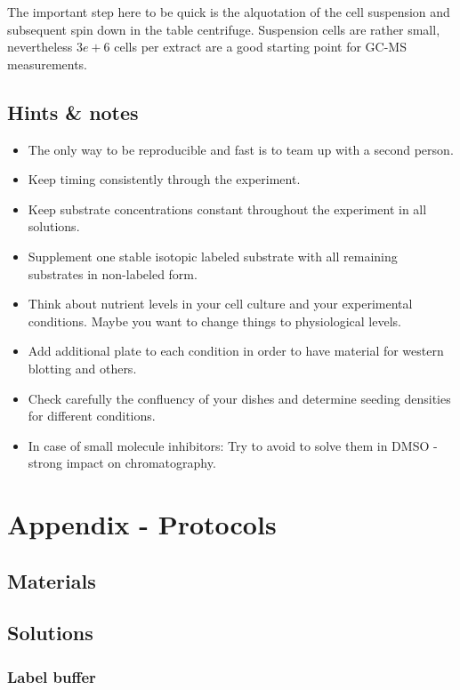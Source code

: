 \documentclass[]{book}
\providecommand{\tightlist}{%
  \setlength{\itemsep}{0pt}\setlength{\parskip}{0pt}}
\theoremstyle{definition}
\theoremstyle{definition}
\theoremstyle{definition}
\theoremstyle{remark}
\begin{document}
The important step here to be quick is the alquotation of the cell
suspension and subsequent spin down in the table centrifuge. Suspension
cells are rather small, nevertheless \(3e+6\) cells per extract are a
good starting point for GC-MS measurements.

\section{Hints \& notes}\label{hints-notes}

\begin{itemize}
\tightlist
\item
  The only way to be reproducible and fast is to team up with a second
  person.
\item
  Keep timing consistently through the experiment.
\item
  Keep substrate concentrations constant throughout the experiment in
  all solutions.
\item
  Supplement one stable isotopic labeled substrate with all remaining
  substrates in non-labeled form.
\item
  Think about nutrient levels in your cell culture and your experimental
  conditions. Maybe you want to change things to physiological levels.
\item
  Add additional plate to each condition in order to have material for
  western blotting and others.
\item
  Check carefully the confluency of your dishes and determine seeding
  densities for different conditions.
\item
  In case of small molecule inhibitors: Try to avoid to solve them in
  DMSO - strong impact on chromatography.
\end{itemize}

\chapter{Appendix - Protocols}\label{protocols}

\section{Materials}\label{materials}

\section{Solutions}\label{solutions}

\hypertarget{washingbuffer}{\subsection{Label
buffer}\label{washingbuffer}}
\end{document}
